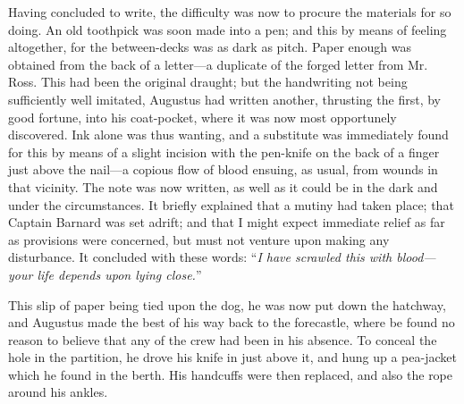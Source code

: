 Having concluded to write, the difficulty was now to procure the materials
for so doing. An old toothpick was soon made into a pen; and this by means of
feeling altogether, for the between-decks was as dark as pitch. Paper enough was
obtained from the back of a letter---a duplicate of the forged letter from Mr.
Ross. This had been the original draught; but the handwriting not being
sufficiently well imitated, Augustus had written another, thrusting the first,
by good fortune, into his coat-pocket, where it was now most opportunely
discovered. Ink alone was thus wanting, and a substitute was immediately found
for this by means of a slight incision with the pen-knife on the back of a
finger just above the nail---a copious flow of blood ensuing, as usual, from
wounds in that vicinity. The note was now written, as well as it could be in the
dark and under the circumstances. It briefly explained that a mutiny had taken
place; that Captain Barnard was set adrift; and that I might expect immediate
relief as far as provisions were concerned, but must not venture upon making any
disturbance. It concluded with these words: ``\emph{I have scrawled this with
blood---your life depends upon lying close.}'' 

This slip of paper being tied upon the dog, he was now put down the hatchway,
and Augustus made the best of his way back to the forecastle, where be found no
reason to believe that any of the crew had been in his absence. To conceal the
hole in the partition, he drove his knife in just above it, and hung up a
pea-jacket which he found in the berth. His handcuffs were then replaced, and
also the rope around his ankles. 

